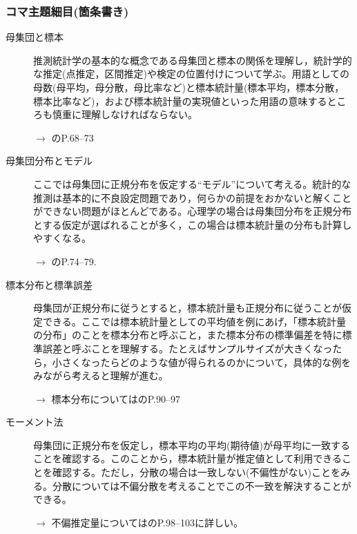 \subsubsection{コマ主題細目(箇条書き)}
\begin{description}
\item[母集団と標本]推測統計学の基本的な概念である母集団と標本の関係を理解し，統計学的な推定(点推定，区間推定)や検定の位置付けについて学ぶ。用語としての母数(母平均，母分散，母比率など)と標本統計量(標本平均，標本分散，標本比率など)，および標本統計量の実現値といった用語の意味するところも慎重に理解しなければならない。
    \begin{flushright}
        $\to$ \citet{Yamada2004}のP.68--73
    \end{flushright}

\item[母集団分布とモデル]ここでは母集団に正規分布を仮定する``モデル''について考える。統計的な推測は基本的に不良設定問題であり，何らかの前提をおかないと解くことができない問題がほとんどである。心理学の場合は母集団分布を正規分布とする仮定が選ばれることが多く，この場合は標本統計量の分布も計算しやすくなる。
\begin{flushright}
    $\to$ \citet{Yamada2004}のP.74--79.
\end{flushright}

\item[標本分布と標準誤差]母集団が正規分布に従うとすると，標本統計量も正規分布に従うことが仮定できる。ここでは標本統計量としての平均値を例にあげ，「標本統計量の分布」のことを標本分布と呼ぶこと，また標本分布の標準偏差を特に標準誤差と呼ぶことを理解する。たとえばサンプルサイズが大きくなったら，小さくなったらどのような値が得られるのかについて，具体的な例をみながら考えると理解が進む。
\begin{flushright}
    $\to$ 標本分布については\citet{Yamada2004}のP.90--97
\end{flushright}

\item[モーメント法]母集団に正規分布を仮定し，標本平均の平均(期待値)が母平均に一致することを確認する。このことから，標本統計量が推定値として利用できることを確認する。ただし，分散の場合は一致しない(不偏性がない)ことをみる。分散については不偏分散を考えることでこの不一致を解決することができる。
\begin{flushright}
    $\to$ 不偏推定量については\citet{Yamada2004}のP.98--103に詳しい。
\end{flushright}

\end{description}

